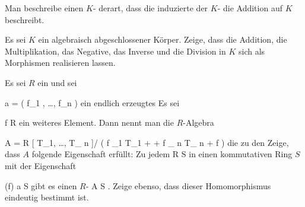 {}
{





Man beschreibe einen
$K$-
derart, dass die induzierte
der
$K$-
die Addition auf $K$ beschreibt.





}
{} {}

{}
{





Es sei $K$ ein algebraisch abgeschlossener Körper. Zeige, dass die Addition, die Multiplikation, das Negative, das Inverse und die Division in $K$ sich als Morphismen realisieren lassen.





}
{} {}

{}
{





Es sei $R$ ein
und sei

\mavergleichskette
{\vergleichskette
{ {\mathfrak a}
}
{ = }{  \left(  f_1 , \ldots ,  f_n  \right)
}
{  }{
}
{    }{
}
{   }{
}
}
{}{}{}
ein endlich erzeugtes
Es sei

\mavergleichskette
{\vergleichskette
{ f
}
{ \in }{ R
}
{  }{
}
{    }{
}
{   }{
}
}
{}{}{}
ein weiteres Element. Dann nennt man die $R$-Algebra

\mavergleichskettedisp
{\vergleichskette
{A
}
{ =} { R [ T_1, \ldots ,  T_{ n }]/ \left(   f _1  T_{1}   + \cdots +   f _{ n } T_{ n }+ f   \right)
}
{ } {
}
{ } {
}
{ } {
}
}
{}{}{}
die  zu den
 Zeige, dass $A$ folgende Eigenschaft erfüllt: Zu jedem
\maabb {\varphi} { R } { S
} {}
in einen kommutativen Ring $S$ mit der Eigenschaft

\mavergleichskette
{\vergleichskette
{ \varphi(f)
}
{ \in }{ {\mathfrak a} S
}
{  }{
}
{    }{
}
{   }{
}
}
{}{}{}
gibt es einen
$R$-
\maabb {\vartheta} { A } { S
} {.}
Zeige ebenso, dass dieser Homomorphismus
 eindeutig bestimmt ist.





}
{} {}

